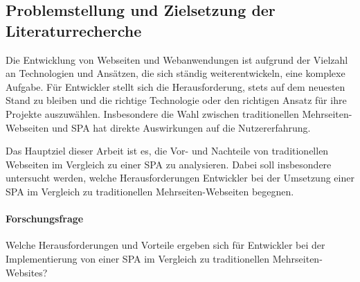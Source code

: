 \subsection{Problemstellung und Zielsetzung der Literaturrecherche}

Die Entwicklung von Webseiten und Webanwendungen ist aufgrund der Vielzahl an Technologien und Ansätzen, die sich ständig weiterentwickeln, eine komplexe Aufgabe. 
Für Entwickler stellt sich die Herausforderung, stets auf dem neuesten Stand zu bleiben und die richtige Technologie oder den richtigen Ansatz für ihre Projekte auszuwählen. 
Insbesondere die Wahl zwischen traditionellen Mehrseiten-Webseiten und \ac{SPA} hat direkte Auswirkungen auf die Nutzererfahrung.

Das Hauptziel dieser Arbeit ist es, die Vor- und Nachteile von traditionellen Webseiten im Vergleich zu einer \ac{SPA} zu analysieren. 
Dabei soll insbesondere untersucht werden, welche Herausforderungen Entwickler bei der Umsetzung einer \ac{SPA} im Vergleich zu traditionellen Mehrseiten-Webseiten begegnen.

\paragraph*{Forschungsfrage}
Welche Herausforderungen und Vorteile ergeben sich für Entwickler bei der Implementierung von einer \ac{SPA} im Vergleich zu traditionellen Mehrseiten-Websites?

